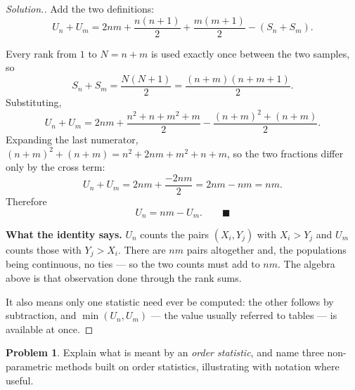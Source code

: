 \documentclass[11pt,a4paper]{article}
\theoremstyle{definition}
\newtheorem{problemx}{Problem}[section]
\newenvironment{problem}{\begin{problemx}}{\end{problemx}}
\newenvironment{solution}
  {\renewcommand{\qedsymbol}{}\begin{proof}[\textit{Solution}.]}
  {\end{proof}}
\begin{document}
\begin{solution}
Add the two definitions:
$$U_n + U_m = 2nm + \dfrac{n(n+1)}{2} + \dfrac{m(m+1)}{2} - \left(S_n + S_m\right).$$

Every rank from $1$ to $N = n+m$ is used exactly once between the two samples, so
$$S_n + S_m = \dfrac{N(N+1)}{2} = \dfrac{(n+m)(n+m+1)}{2}.$$
Substituting,
$$U_n + U_m = 2nm + \dfrac{n^{2}+n+m^{2}+m}{2}
- \dfrac{(n+m)^{2}+(n+m)}{2}.$$
Expanding the last numerator, $(n+m)^{2}+(n+m) = n^{2}+2nm+m^{2}+n+m$, so the two
fractions differ only by the cross term:
$$U_n + U_m = 2nm + \dfrac{-2nm}{2} = 2nm - nm = nm .$$
Therefore
$$\boxed{U_n = nm - U_m .} \qquad \blacksquare$$

\textbf{What the identity says.} $U_n$ counts the pairs $(X_i, Y_j)$ with
$X_i > Y_j$ and $U_m$ counts those with $Y_j > X_i$. There are $nm$ pairs
altogether and, the populations being continuous, no ties --- so the two counts must
add to $nm$. The algebra above is that observation done through the rank sums.

It also means only one statistic need ever be computed: the other follows by
subtraction, and $\min(U_n, U_m)$ --- the value usually referred to tables --- is
available at once.
\end{solution}

\begin{problem}
Explain what is meant by an \emph{order statistic}, and name three non-parametric
methods built on order statistics, illustrating with notation where useful.
\end{problem}
\end{document}
